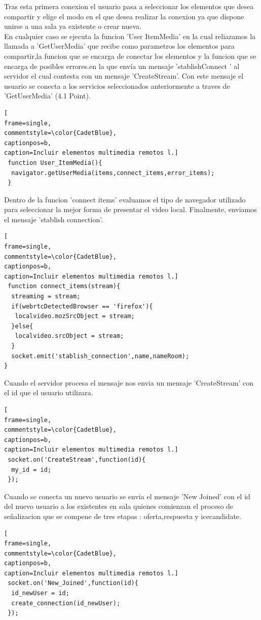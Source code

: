 Tras esta primera conexion el usuario pasa a seleccionar los elementos que desea compartir y elige el modo en el que desea realizar la conexion ya que dispone unirse a una sala ya existente o crear nueva.
\\En cualquier caso se ejecuta la funcion 'User ItemMedia' en la cual reliazamos la llamada a 'GetUserMedia' que recibe como parametros los elementos para compartir,la funcion que se encarga de conectar los elementos y la funcion que se encarga de posibles errores.en la que envía un mensaje 'stablishConnect ' al servidor el cual contesta con un mensaje 'CreateStream'. Con este mensaje el usuario se conecta a los servicios seleccionados anteriormente a traves de  'GetUserMedia' (4.1 Point).
\begin{lstlisting}[
frame=single,
commentstyle=\color{CadetBlue},
captionpos=b,
caption=Incluir elementos multimedia remotos l.]
 function User_ItemMedia(){
  navigator.getUserMedia(items,connect_items,error_items);
 }
 \end{lstlisting}
 Dentro de la funcion 'connect items' evaluamos el tipo de navegador utilizado para seleccionar la mejor forma de presentar el video local. Finalmente, enviamos el mensaje  'stablish connection'. 
 \begin{lstlisting}[
frame=single,
commentstyle=\color{CadetBlue},
captionpos=b,
caption=Incluir elementos multimedia remotos l.]
 function connect_items(stream){
  streaming = stream;
  if(webrtcDetectedBrowser == 'firefox'){
   localvideo.mozSrcObject = stream;
  }else{
   localvideo.srcObject = stream;
  }
  socket.emit('stablish_connection',name,nameRoom);
}
\end{lstlisting}
Cuando el servidor procesa el mensaje nos envia un mensaje 'CreateStream' con el id que el usuario utilizara. 
\begin{lstlisting}[
frame=single,
commentstyle=\color{CadetBlue},
captionpos=b,
caption=Incluir elementos multimedia remotos l.]
 socket.on('CreateStream',function(id){
  my_id = id;
 });
\end{lstlisting}
Cuando se conecta un nuevo usuario se envia el mensaje 'New Joined' con el id del nuevo usuario a los  existentes en sala  quienes comienzan el proceso de señalizacion que se compene de tres etapas : oferta,respuesta y icecandidate.
\begin{lstlisting}[
frame=single,
commentstyle=\color{CadetBlue},
captionpos=b,
caption=Incluir elementos multimedia remotos l.]
 socket.on('New_Joined',function(id){
  id_newUser = id;
  create_connection(id_newUser);
 });
\end{lstlisting}
